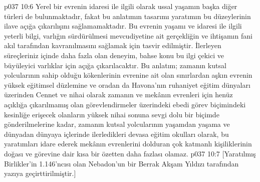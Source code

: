 \vs p037 10:6 Yerel bir evrenin idaresi ile ilgili olarak ussal yaşamın başka diğer türleri de bulunmaktadır, fakat bu anlatımın tasarımı yaratımın bu düzeylerinin ilave açığa çıkarılışını sağlamamaktadır. Bu evrenin yaşamı ve idaresi ile ilgili yeterli bilgi, varlığın sürdürülmesi mevcudiyetine ait gerçekliğin ve ihtişamın fani akıl tarafından kavranılmasını sağlamak için tasvir edilmiştir. İlerleyen süreçleriniz içinde daha fazla olan deneyim, bahse konu bu ilgi çekici ve büyüleyici varlıklar için açığa çıkarılacaktır. Bu anlatım; zamanın kutsal yolcularının sahip olduğu kökenlerinin evrenine ait olan sınırlardan aşkın evrenin yüksek eğitimsel düzlemine ve oradan da Havona’nın ruhaniyet eğitim dünyaları üzerinden Cennet ve nihai olarak zamanın ve mekânın evrenleri için henüz açıklığa çıkarılmamış olan görevlendirmeler üzerindeki ebedi görev biçimindeki kesinliğe erişecek olanların yüksek nihai sonuna sevgi dolu bir biçimde gönderilmelerine kadar, zamanın kutsal yolcularının yaşamdan yaşama ve dünyadan dünyaya içlerinde ilerledikleri devasa eğitim okulları olarak, bu yaratımları idare ederek mekânın evrenlerini dolduran çok katmanlı kişiliklerinin doğası ve görevine dair kısa bir özetten daha fazlası olamaz.
\vs p037 10:7 [Yaratılmış Birlikler’in 1.146’ncısı olan Nebadon’un bir Berrak Akşam Yıldızı tarafından yazıya geçirttirilmiştir.]
